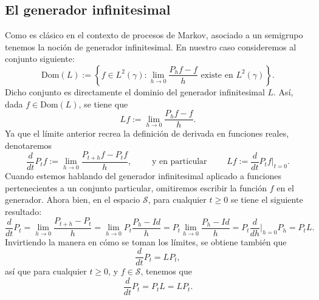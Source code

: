 \documentclass[letterpaper,twoside,12pt]{book}
\renewcommand{\S}{\mathcal{S}}
\newcommand{\1}{\mathds{1}}
\renewcommand{\to}{\rightarrow}
\theoremstyle{definition}
\theoremstyle{definition}
\theoremstyle{remark}
\theoremstyle{definition}
\theoremstyle{definition}
\theoremstyle{definition}
\theoremstyle{definition}
\theoremstyle{definition}
\begin{document}
\subsection{El generador infinitesimal}
 Como es clásico en el contexto de procesos de Markov, asociado a un semigrupo tenemos la noción de generador infinitesimal. En nuestro caso consideremos al conjunto siguiente:
 \[
 \text{Dom}(L):=\left\{f\in L^2(\gamma): \lim_{h\to 0} \frac{P_{h}f-f}{h} \text{ existe en } L^{2}(\gamma)\right\}.
 \]  
Dicho conjunto es directamente el dominio del generador infinitesimal $L$. Así, dada $f\in \text{Dom}(L)$, se tiene que 
\[
Lf:=\lim_{h\to 0}\frac{P_hf-f}{h}.    
\]
Ya que el límite anterior recrea la definición de derivada en funciones reales, denotaremos
\[
   \frac{d}{dt}P_tf:=\lim_{h\to0}\frac{P_{t+h}f-P_tf}{h}, \qquad \text{ y en particular } \qquad  Lf:=\frac{d}{dt}P_tf\bigg|_{t=0}.
\]
Cuando estemos hablando del generador infinitesimal aplicado a funciones pertenecientes a un conjunto particular, omitiremos escribir la función $f$ en el generador. Ahora bien, en el espacio $\S$, para cualquier $t\geq0$ se tiene el siguiente resultado:
\[
\frac{d}{dt}P_t=\lim_{h\to0}\frac{P_{t+h}-P_t}{h}=\lim_{h\to0}P_t\frac{P_h-Id}{h}=P_t\lim_{h\to0}\frac{P_h-Id}{h}=P_t\frac{d}{dh}\bigg|_{h=0}P_h=P_tL.
\]
Invirtiendo la manera en cómo se toman los límites, se obtiene también que
\[
\frac{d}{dt}P_t=LP_t,  
\]
así que para cualquier $t\geq0$, y $f\in \S$, tenemos que 
\[
\frac{d}{dt}P_t=P_tL=LP_t.
\]
\end{document}
